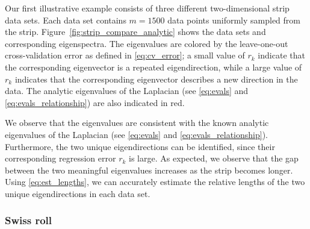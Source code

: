 \documentclass[preprint]{elsarticle}
\begin{document}
Our first illustrative example consists of three different two-dimensional strip data sets. 
%
Each data set contains $m=1500$ data points uniformly sampled from the strip. 
%
Figure~\ref{fig:strip_compare_analytic} shows the data sets and corresponding eigenspectra.
%
The eigenvalues are colored by the leave-one-out cross-validation error as defined in \eqref{eq:cv_error}; a small value of $r_k$ indicate that the corresponding eigenvector is a repeated eigendirection, while a large value of $r_k$ indicates that the corresponding eigenvector describes a new direction in the data. 
%
The analytic eigenvalues of the Laplacian (see \eqref{eq:evals} and \eqref{eq:evals_relationship}) are also indicated in red. 

We observe that the eigenvalues are consistent with the known analytic eigenvalues of the Laplacian (see \eqref{eq:evals} and \eqref{eq:evals_relationship}).
%
Furthermore, the two unique eigendirections can be identified, since their corresponding regression error $r_k$ is large. 
%
As expected, we observe that the gap between the two meaningful eigenvalues increases as the strip becomes longer. 
%
Using \eqref{eq:est_lengths}, we can accurately estimate the relative lengths of the two unique eigendirections in each data set. 


\subsubsection{Swiss roll}
\end{document}

